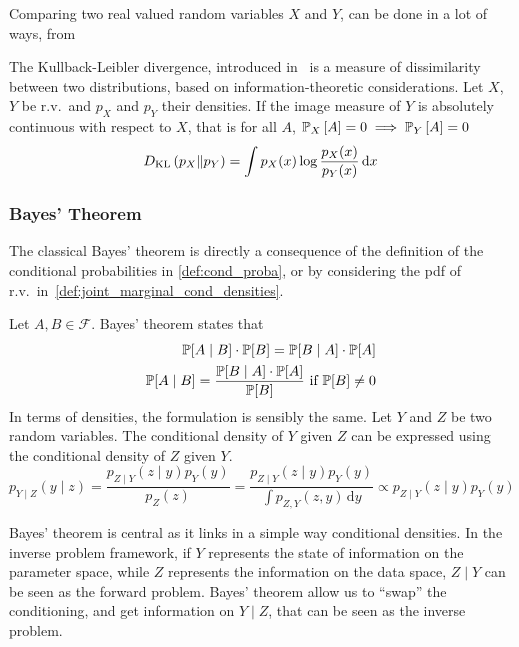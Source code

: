 \documentclass[../../Main_ManuscritThese.tex]{subfiles}
\begin{document}
Comparing two real valued random variables $X$ and $Y$, can be done in a lot of ways, from 
\begin{definition}[KL--divergence]
  
  The Kullback-Leibler divergence, introduced in~\cite{kullback_information_1951} is a measure of dissimilarity between two distributions, based on information-theoretic considerations.
  Let $X$, $Y$ be r.v.\ and $p_X$ and $p_Y$ their densities. If the image measure of $Y$ is absolutely continuous with respect to $X$, that is for all $A$, $\mathbb{P}_{X}\left[A\right] = 0 \implies \mathbb{P}_{Y}\left[A\right] = 0$
  \begin{equation}
    D_{\mathrm{KL}}\left(p_X \| p_Y\right) = \int p_X(x) \log \frac{p_X(x)}{p_Y(x)} \,\mathrm{d}x
  \end{equation}
\end{definition}


\subsubsection{Bayes' Theorem}
\label{ssec:bayes_theorem}

The classical Bayes' theorem is directly a consequence of the definition of the conditional probabilities in \cref{def:cond_proba}, or by considering the pdf of r.v.\ in~\cref{def:joint_marginal_cond_densities}.

\begin{theorem}
  Let $A, B\in\mathcal{F}$. Bayes' theorem states that
  \begin{align*}
    \mathbb{P}[A\mid B]\cdot \mathbb{P}[B] = \mathbb{P}[B \mid A]\cdot\mathbb{P}[A] \\
    \mathbb{P}[A \mid B] = \frac{\mathbb{P}[B \mid A]\cdot\mathbb{P}[A]}{\mathbb{P}[B]} \text{ if } \mathbb{P}[B] \neq 0
  \end{align*}
 In terms of densities, the formulation is sensibly the same.
  Let $Y$ and $Z$ be two random variables. The conditional density of $Y$ given $Z$ can be expressed using the conditional density of $Z$ given $Y$.
  \begin{equation}
    p_{Y\mid Z}(y \mid z) = \frac{p_{Z\mid Y}(z\mid y) p_Y(y)}{p_Z(z)} = \frac{p_{Z\mid Y}(z\mid y) p_Y(y)}{\int p_{Z,Y}(z,y) \,\mathrm{d}y}  \propto p_{Z\mid Y}(z\mid y) p_Y(y)
  \end{equation}
\end{theorem}
Bayes' theorem is central as it links in a simple way conditional densities. In the inverse problem framework, if $Y$ represents the state of information on the parameter space, while $Z$ represents the information on the data space, $Z\mid Y$ can be seen as the forward problem. Bayes' theorem allow us to ``swap'' the conditioning, and get information on $Y\mid Z$, that can be seen as the inverse problem.
\end{document}

